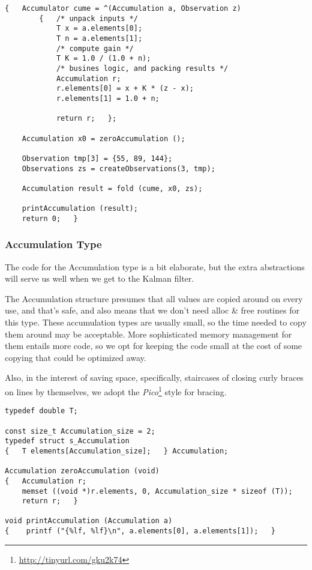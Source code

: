 \documentclass[10pt,oneside,x11names]{article}
\begin{document}
\begin{verbatim}
{   Accumulator cume = ^(Accumulation a, Observation z)
        {   /* unpack inputs */
            T x = a.elements[0];
            T n = a.elements[1];
            /* compute gain */
            T K = 1.0 / (1.0 + n);
            /* busines logic, and packing results */
            Accumulation r;
            r.elements[0] = x + K * (z - x);
            r.elements[1] = 1.0 + n;

            return r;   };

    Accumulation x0 = zeroAccumulation ();

    Observation tmp[3] = {55, 89, 144};
    Observations zs = createObservations(3, tmp);

    Accumulation result = fold (cume, x0, zs);

    printAccumulation (result);
    return 0;   }
\end{verbatim}

\subsubsection{Accumulation Type}
\label{sec:orgheadline2}

The code for the Accumulation type is a bit elaborate, but the extra
abstractions will serve us well when we get to the Kalman filter.

The Accumulation structure presumes that all values are copied around on every
use, and that's safe, and also means that we don't need alloc \& free routines
for this type. These accumulation types are usually small, so the time needed to
copy them around may be acceptable. More sophisticated memory management for
them entails more code, so we opt for keeping the code small at the cost of some
copying that could be optimized away.

Also, in the interest of saving space, specifically, staircases of closing curly
braces on lines by themselves, we adopt the \emph{Pico}\footnote{\url{http://tinyurl.com/gku2k74}} style for bracing. 

\begin{verbatim}
typedef double T;

const size_t Accumulation_size = 2;
typedef struct s_Accumulation
{   T elements[Accumulation_size];   } Accumulation;

Accumulation zeroAccumulation (void)
{   Accumulation r;
    memset ((void *)r.elements, 0, Accumulation_size * sizeof (T));
    return r;   }

void printAccumulation (Accumulation a)
{    printf ("{%lf, %lf}\n", a.elements[0], a.elements[1]);   }
\end{verbatim}
\end{document}
